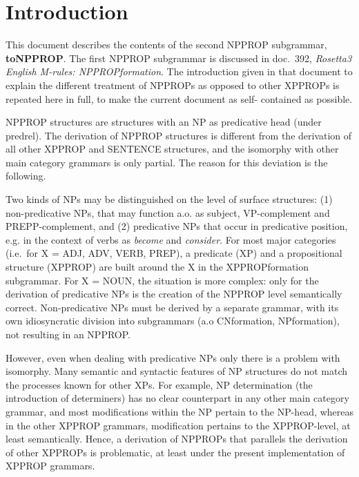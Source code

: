 
   \RosSupersedes{-}
   \MakeRosTitle
%
%

\section{Introduction}
This document describes the contents of the second NPPROP subgrammar, 
{\bf toNPPROP}. The first NPPROP subgrammar is discussed in doc.\ 392, 
{\em Rosetta3 English M-rules: NPPROPformation\/}. The introduction given in 
that document to explain the different treatment of NPPROPs as opposed to other 
XPPROPs is repeated here in full, to make the current document as self-
contained as possible.

NPPROP structures are structures with an NP as predicative head (under predrel).
The derivation of NPPROP structures is different from the derivation of all
other XPPROP and SENTENCE structures, and the isomorphy with other 
main category grammars is only partial. 
The reason for this deviation is the following.

Two kinds  of NPs may be distinguished on the level of
surface structures: (1) non-predicative NPs, 
that may function a.o. as subject, VP-complement and PREPP-complement, and 
(2) predicative NPs that occur in predicative position, e.g. in the context 
of verbs as {\em become\/} and {\em consider\/}. 
For most major categories (i.e.\ for X = ADJ, ADV, VERB, PREP), 
a predicate (XP) and a propositional structure (XPPROP) are built around the 
X in the XPPROPformation subgrammar. For X = NOUN, the situation is more 
complex: only for the derivation of predicative NPs is the 
creation of the NPPROP level semantically correct. 
Non-predicative NPs must be derived by a separate grammar, with its own 
idiosyncratic division into subgrammars (a.o CNformation, NPformation), not 
resulting in an NPPROP.

However, even when dealing with predicative NPs only there is a problem with 
isomorphy.
Many semantic and syntactic features of NP structures do not match the 
processes known for other XPs.
For example, NP determination (the introduction of determiners) has no clear
counterpart in any other main category grammar, and most 
modifications within the NP pertain to the NP-head, whereas in the  
other XPPROP grammars, modification pertains to the XPPROP-level, at 
least semantically. Hence, a derivation of 
NPPROPs that parallels the derivation of other XPPROPs is 
problematic, at least under the present implementation of XPPROP grammars.

